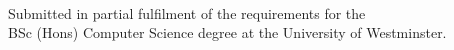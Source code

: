\begin{titlepage}
\begin{center}

\vfill
{}\\[0.1cm]

\vfill
{Submitted in partial fulfilment of the requirements for the \\BSc (Hons) Computer Science degree at the University of Westminster.} \\[0.1cm]

 

 
\end{center}
 
\end{titlepage}